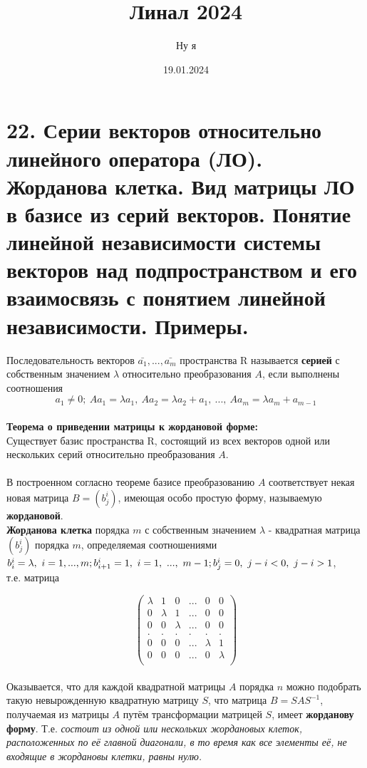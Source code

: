\documentclass[14pt]{extarticle}
\title{Линал 2024}
\author{Ну я}
\date{19.01.2024}
\begin{document}
\maketitle
\tableofcontents

\section{22. 
    Серии векторов относительно линейного оператора (ЛО). Жорданова клетка. 
    Вид матрицы ЛО в базисе из серий векторов. Понятие линейной независимости 
    системы векторов над подпространством и его взаимосвязь 
    с понятием линейной независимости. Примеры.
}

Последовательность векторов $\bar{a_1}, ..., \bar{a_m}$
пространства R называется \textbf{серией} с собственным значением 
$\lambda$ относительно преобразования $A$, если выполнены соотношения
$$ a_1 \neq 0; \ Aa_1 = \lambda a_1, \ Aa_2 = \lambda a_2 + a_1, \ ..., \
Aa_m = \lambda a_m + a_{m-1} $$
\\
\textbf{Теорема о приведении матрицы к жордановой форме:} \\
Существует базис пространства R, состоящий из всех векторов одной или 
нескольких серий относительно преобразования $A$. 
\\\\
В построенном согласно теореме базисе преобразованию $A$ соответствует 
некая новая матрица $B = (b^i_j)$, имеющая особо простую форму, 
называемую \textbf{жордановой}. \\
\textbf{Жорданова клетка} порядка $m$ с собственным значением $\lambda$ -
квадратная матрица $(b^i_j)$ порядка $m$, определяемая соотношениями \\
$ b^i_i = \lambda, \ i = 1, ... , m; \\ b^i_{i+1} = 1, \ i = 1, \ ... , \
m - 1; \\ b^i_j = 0, \ j - i < 0, \ j - i > 1 $, \\ т.е. матрица 

\[\begin{pmatrix}
    \lambda & 1 & 0 & ... & 0 & 0 \\
    0 & \lambda & 1 & ... & 0 & 0 \\
    0 & 0 & \lambda & ... & 0 & 0 \\
    . & . & . & . & . & .         \\
    0 & 0 & 0 & ... & \lambda & 1 \\
    0 & 0 & 0 & ... & 0 & \lambda \\
\end{pmatrix}\]
\\
Оказывается, что для каждой квадратной матрицы $A$ порядка $n$ можно
подобрать такую невырожденную квадратную матрицу $S$, что матрица
$B = SAS^{-1}$, получаемая из матрицы $A$ путём трансформации 
матрицей $S$, имеет \textbf{жорданову форму}. Т.е. \textsl{состоит из 
одной или нескольких жордановых клеток, расположенных по её главной 
диагонали, в то время как все элементы её, не входящие в жордановы 
клетки, равны нулю.} 
\end{document}
